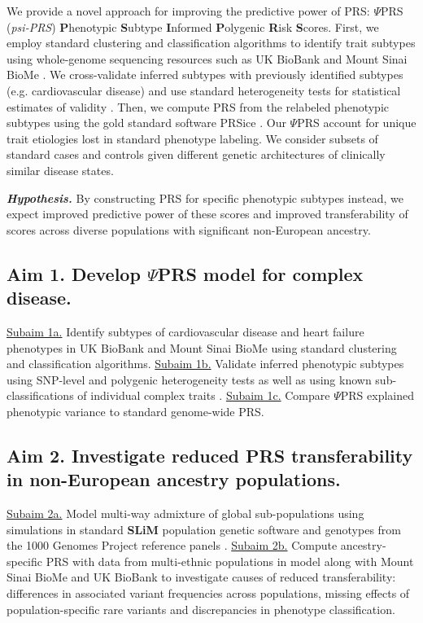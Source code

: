 \documentclass[11pt]{article}  %
\newcommand{\inden}[1]{\mbox{} \hspace{#1} } %
\begin{document}
We provide a novel approach for improving the predictive power of PRS: $\Psi$PRS (\textit{psi-PRS}) \textbf{P}henotypic \textbf{S}ubtype \textbf{I}nformed \textbf{P}olygenic \textbf{R}isk \textbf{S}cores. First, we employ standard clustering and classification algorithms to identify trait subtypes using whole-genome sequencing resources such as UK BioBank and Mount Sinai BioMe \cite{bycroft_uk_2018}. We cross-validate inferred subtypes with previously identified subtypes (e.g. cardiovascular disease) and use standard heterogeneity tests for statistical estimates of validity \cite{dahl_robust_2020}. Then, we compute PRS from the relabeled phenotypic subtypes using the gold standard software PRSice \cite{choi_prsice-2_2019}. Our $\Psi$PRS account for unique trait etiologies lost in standard phenotype labeling. We consider subsets of standard cases and controls given different genetic architectures of clinically similar disease states. 

\textbf{\textit{Hypothesis.}} By constructing PRS for specific phenotypic subtypes instead, we expect improved predictive power of these scores and improved transferability of scores across diverse populations with significant non-European ancestry.

\subsection*{Aim 1. Develop $\Psi$PRS model for complex disease.}
\underline{Subaim 1a.} Identify subtypes of cardiovascular disease and heart failure phenotypes in UK BioBank and Mount Sinai BioMe using standard clustering and classification algorithms. \underline{Subaim 1b.} Validate inferred phenotypic subtypes using SNP-level \cite{dahl_reverse_2019} and polygenic heterogeneity tests \cite{dahl_robust_2020} as well as using known sub-classifications of individual complex traits \cite{li_identification_2015}. \underline{Subaim 1c.} Compare $\Psi$PRS explained phenotypic variance to standard genome-wide PRS.

\subsection*{Aim 2. Investigate reduced PRS transferability in non-European ancestry populations.}
\underline{Subaim 2a.} Model multi-way admixture of global sub-populations using simulations in standard \textbf{SLiM} population genetic software \cite{haller_slim_2019} and genotypes from the 1000 Genomes Project reference panels \cite{noauthor_global_2015}. \underline{Subaim 2b.} Compute ancestry-specific PRS with data from multi-ethnic populations in model along with Mount Sinai BioMe and UK BioBank to investigate causes of reduced transferability: differences in associated variant frequencies across populations, missing effects of population-specific rare variants and discrepancies in phenotype classification. 
\end{document}
